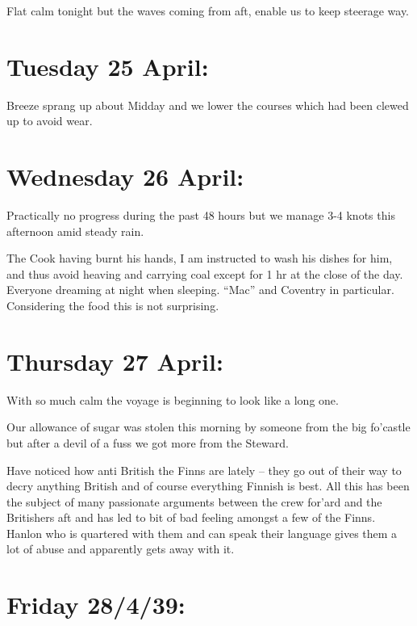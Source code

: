 \documentclass[
  11pt,
  msmallroyalvopaper
]{memoir}
\begin{document}
Flat calm tonight but the waves coming from aft, enable us to keep
steerage way.

\hypertarget{tuesday-25-april}{%
\section{Tuesday 25 April:}\label{tuesday-25-april}}

Breeze sprang up about Midday and we lower the courses which had been
clewed up to avoid wear.

\hypertarget{wednesday-26-april}{%
\section{Wednesday 26 April:}\label{wednesday-26-april}}

Practically no progress during the past 48 hours but we manage 3-4 knots
this afternoon amid steady rain.

The Cook having burnt his hands, I am instructed to wash his dishes for
him, and thus avoid heaving and carrying coal except for 1 hr at the
close of the day. Everyone dreaming at night when sleeping. ``Mac'' and
Coventry in particular. Considering the food this is not surprising.

\hypertarget{thursday-27-april}{%
\section{Thursday 27 April:}\label{thursday-27-april}}

With so much calm the voyage is beginning to look like a long one.

Our allowance of sugar was stolen this morning by someone from the big
fo'castle but after a devil of a fuss we got more from the Steward.

Have noticed how anti British the Finns are lately -- they go out of
their way to decry anything British and of course everything Finnish is
best. All this has been the subject of many passionate arguments between
the crew for'ard and the Britishers aft and has led to bit of bad
feeling amongst a few of the Finns. Hanlon who is quartered with them
and can speak their language gives them a lot of abuse and apparently
gets away with it.

\hypertarget{friday-28439}{%
\section{Friday 28/4/39:}\label{friday-28439}}
\end{document}
